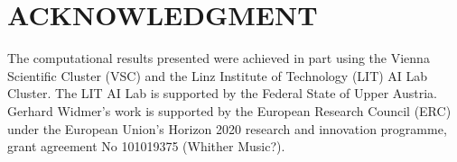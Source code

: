 \documentclass{article}
\begin{document}
\vspace{-6pt}
\section{ACKNOWLEDGMENT}

The computational results presented were achieved in part using the Vienna Scientific Cluster (VSC) and the Linz Institute of Technology (LIT) AI Lab Cluster. The LIT AI Lab is supported by the Federal State of Upper Austria. Gerhard Widmer's work is supported by the European Research Council (ERC) under the European Union's Horizon 2020 research and innovation programme, grant agreement No 101019375 (Whither Music?).



\end{document}
